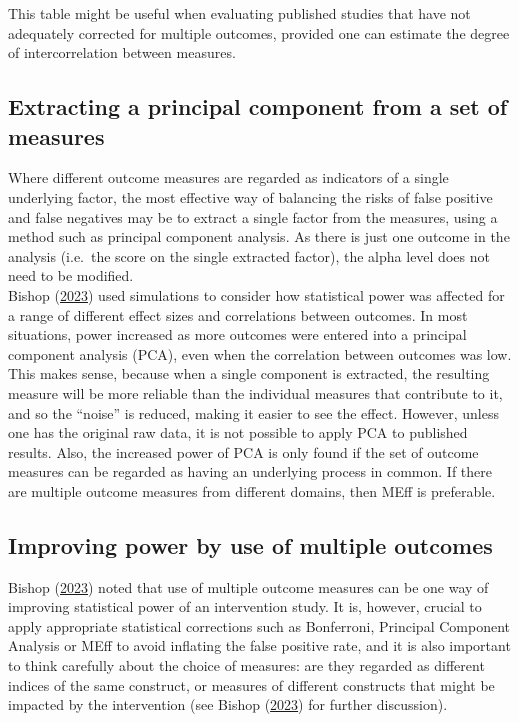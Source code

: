 \documentclass{krantz}
\begin{document}
This table might be useful when evaluating published studies that have not adequately corrected for multiple outcomes, provided one can estimate the degree of intercorrelation between measures.

\hypertarget{extracting-a-principal-component-from-a-set-of-measures}{%
\subsection{Extracting a principal component from a set of measures}\label{extracting-a-principal-component-from-a-set-of-measures}}

Where different outcome measures are regarded as indicators of a single underlying factor, the most effective way of balancing the risks of false positive and false negatives may be to extract a single factor from the measures, using a method such as principal component analysis. As there is just one outcome in the analysis (i.e.~the score on the single extracted factor), the alpha level does not need to be modified.\\
Bishop (\protect\hyperlink{ref-bishop2023b}{2023}) used simulations to consider how statistical power was affected for a range of different effect sizes and correlations between outcomes. In most situations, power increased as more outcomes were entered into a principal component analysis (PCA), even when the correlation between outcomes was low. This makes sense, because when a single component is extracted, the resulting measure will be more reliable than the individual measures that contribute to it, and so the ``noise'' is reduced, making it easier to see the effect. However, unless one has the original raw data, it is not possible to apply PCA to published results. Also, the increased power of PCA is only found if the set of outcome measures can be regarded as having an underlying process in common. If there are multiple outcome measures from different domains, then MEff is preferable.

\hypertarget{improving-power-by-use-of-multiple-outcomes}{%
\subsection{Improving power by use of multiple outcomes}\label{improving-power-by-use-of-multiple-outcomes}}

Bishop (\protect\hyperlink{ref-bishop2023b}{2023}) noted that use of multiple outcome measures can be one way of improving statistical power of an intervention study. It is, however, crucial to apply appropriate statistical corrections such as Bonferroni, Principal Component Analysis or MEff to avoid inflating the false positive rate, and it is also important to think carefully about the choice of measures: are they regarded as different indices of the same construct, or measures of different constructs that might be impacted by the intervention (see Bishop (\protect\hyperlink{ref-bishop2023b}{2023}) for further discussion).
\end{document}
